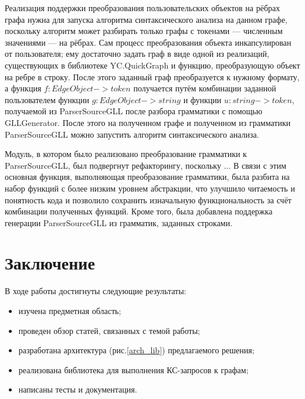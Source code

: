 \documentclass[14pt]{matmex-diploma-custom}
\begin{document}
    Реализация поддержки преобразования пользовательских объектов на рёбрах графа нужна для запуска алгоритма синтаксического анализа на данном графе, поскольку алгоритм может разбирать только графы с токенами --- численным значениями --- на рёбрах. Сам процесс преобразования объекта инкапсулирован от пользователя; ему достаточно задать граф в виде одной из реализаций, существующих в библиотеке YC.QuickGraph и функцию, преобразующую объект на ребре в строку. После этого заданный граф преобразуется к нужному формату, а функция \(f: EdgeObject -> token\) получается путём комбинации заданной пользователем функции \(g: EdgeObject -> string\) и функции \(u: string -> token\), получаемой из ParserSourceGLL после разбора грамматики с помощью GLLGenerator. После этого на полученном графе и полученном из грамматики ParserSourceGLL можно запустить алгоритм синтаксического анализа.
    
    Модуль, в котором было реализовано преобразование грамматики к ParserSourceGLL, был подвергнут рефакторингу, поскольку ... В связи с этим основная функция, выполняющая преобразование грамматики, была разбита на набор функций с более низким уровнем абстракции, что улучшило читаемость и понятность кода и позволило сохранить изначальную функциональность за счёт комбинации полученных функций. Кроме того, была добавлена поддержка генерации ParserSourceGLL из грамматик, заданных строками.
    
    
\section{Заключение}
В ходе работы достигнуты следующие результаты:
\begin{itemize}
    \item изучена предметная область;
    \item проведен обзор статей, связанных с темой работы;
    \item разработана архитектура (рис.\ref{arch_lib}) предлагаемого решения;
    \item реализована библиотека для выполнения КС-запросов к графам;
    \item написаны тесты и документация.
\end{itemize}
\setmonofont[Mapping=tex-text]{CMU Typewriter Text}


\end{document}
